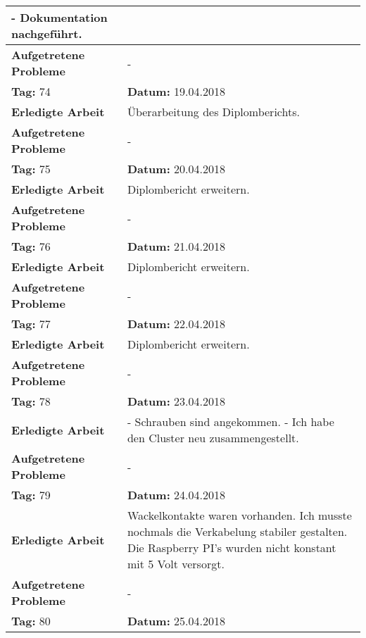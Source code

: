 \begin{longtable}{|p{5cm}|p{5cm}p{6cm}|}
{- Dokumentation nachgeführt.} \\ \hline
\textbf{Aufgetretene Probleme} & \multicolumn{2}{p{11cm}|}{-} \\ \hline
\rowcolor{heading}\textbf{Tag:} 74 & \textbf{Datum:} 19.04.2018 & \\ \hline
\textbf{Erledigte Arbeit} & \multicolumn{2}{p{11cm}|}{Überarbeitung des Diplomberichts.} \\ \hline
\textbf{Aufgetretene Probleme} & \multicolumn{2}{p{11cm}|}{-} \\ \hline
\rowcolor{heading}\textbf{Tag:} 75 & \textbf{Datum:} 20.04.2018 & \\ \hline
\textbf{Erledigte Arbeit} & \multicolumn{2}{p{11cm}|}{Diplombericht erweitern.} \\ \hline
\textbf{Aufgetretene Probleme} & \multicolumn{2}{p{11cm}|}{-} \\ \hline
\rowcolor{heading}\textbf{Tag:} 76 & \textbf{Datum:} 21.04.2018 & \\ \hline
\textbf{Erledigte Arbeit} & \multicolumn{2}{p{11cm}|}{Diplombericht erweitern.} \\ \hline
\textbf{Aufgetretene Probleme} & \multicolumn{2}{p{11cm}|}{-} \\ \hline
\rowcolor{heading}\textbf{Tag:} 77 & \textbf{Datum:} 22.04.2018 & \\ \hline
\textbf{Erledigte Arbeit} & \multicolumn{2}{p{11cm}|}{Diplombericht erweitern.} \\ \hline
\textbf{Aufgetretene Probleme} & \multicolumn{2}{p{11cm}|}{-} \\ \hline
\rowcolor{heading}\textbf{Tag:} 78 & \textbf{Datum:} 23.04.2018 & \\ \hline
\textbf{Erledigte Arbeit} & \multicolumn{2}{p{11cm}|}{- Schrauben sind angekommen.\newline
- Ich habe den Cluster neu zusammengestellt.} \\ \hline
\textbf{Aufgetretene Probleme} & \multicolumn{2}{p{11cm}|}{-} \\ \hline
\rowcolor{heading}\textbf{Tag:} 79 & \textbf{Datum:} 24.04.2018 & \\ \hline
\textbf{Erledigte Arbeit} & \multicolumn{2}{p{11cm}|}{Wackelkontakte waren vorhanden. Ich musste nochmals die Verkabelung stabiler gestalten. Die Raspberry PI's wurden nicht konstant mit 5 Volt versorgt.} \\ \hline
\textbf{Aufgetretene Probleme} & \multicolumn{2}{p{11cm}|}{-} \\ \hline
\rowcolor{heading}\textbf{Tag:} 80 & \textbf{Datum:} 25.04.2018 & \\ \hline

\end{longtable}
